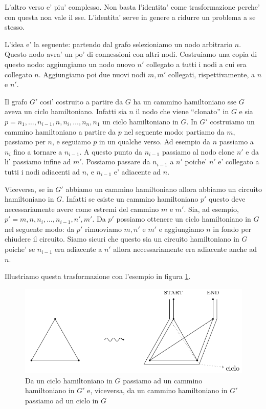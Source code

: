 L'altro verso e' piu' complesso. Non basta l'identita' come trasformazione perche' con questa non
vale il sse. L'identita' serve in genere a ridurre un problema a se stesso.

L'idea e' la seguente: partendo dal grafo selezioniamo un nodo arbitrario $n$. Questo nodo avra' un
po' di connessioni con altri nodi. Costruiamo una copia di questo nodo: aggiungiamo un nodo nuovo
$n'$ collegato a tutti i nodi a cui era collegato $n$. Aggiungiamo poi due nuovi nodi $m,m'$
collegati, rispettivamente, a $n$ e $n'$.

Il grafo $G'$ cosi' costruito a partire da $G$ ha un cammino hamiltoniano sse $G$ aveva un ciclo
hamiltoniano. Infatti sia $n$ il nodo che viene ``clonato'' in $G$ e sia $p = n_{1}, \dotsc,
n_{i-1}, n, n_{i}, \dotsc, n_{n}, n_{1}$ un ciclo hamiltoniano in $G$. In $G'$ costruiamo un cammino
hamiltoniano a partire da $p$ nel seguente modo: partiamo da $m$, passiamo per $n$, e seguiamo $p$
in un qualche verso. Ad esempio da $n$ passiamo a $n_{i}$ fino a tornare a $n_{i-1}$. A questo punto
da $n_{i-1}$ passiamo al nodo clone $n'$ e da li' passiamo infine ad $m'$. Possiamo passare da
$n_{i-1}$ a $n'$ poiche' $n'$ e' collegato a tutti i nodi adiacenti ad $n$, e $n_{i-1}$ e' adiacente
ad $n$.

Viceversa, se in $G'$ abbiamo un cammino hamiltoniano allora abbiamo un circuito hamiltoniano in
$G$. Infatti se esiste un cammino hamiltoniano $p'$ questo deve necessariamente avere come estremi
del cammino $m$ e $m'$. Sia, ad esempio, $p' = m, n, n_{i},\dotsc, n_{i-1}, n', m'$. Da $p'$
possiamo ottenere un ciclo hamiltoniano in $G$ nel seguente modo: da $p'$ rimuoviamo $m, n'$ e $m'$
e aggiungiamo $n$ in fondo per chiudere il circuito. Siamo sicuri che questo sia un circuito
hamiltoniano in $G$ poiche' se $n_{i-1}$ era adiacente a $n'$ allora necessariamente era adiacente
anche ad $n$.

Illustriamo questa trasformazione con l'esempio in figura \ref{img:HAMCYCLEPATH}.

\begin{figure}[h]
    \begin{center}
        \includegraphics{./img/NPClass/HAMCYCLEPATH.pdf}
        \caption{Da un ciclo hamiltoniano in $G$ passiamo ad un cammino hamiltoniano in $G'$ e,
        viceversa, da un cammino hamiltoniano in $G'$ passiamo ad un ciclo in $G$}
        \label{img:HAMCYCLEPATH}
    \end{center}
\end{figure}

